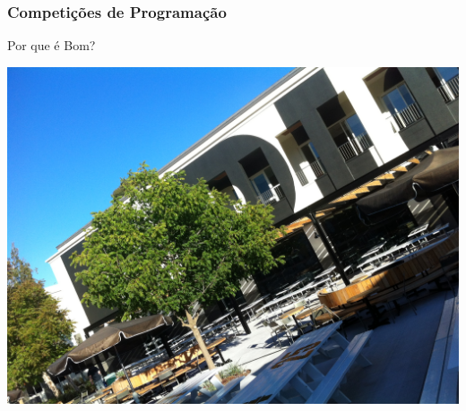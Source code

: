 \begin{frame}
\frametitle{Competições de Programação}
\begin{block}{Por que é Bom?}
\begin{center}
	\includegraphics[width=.7\textwidth]{sntc/IMG_2075.JPG}
\end{center}
\end{block}
\end{frame}

